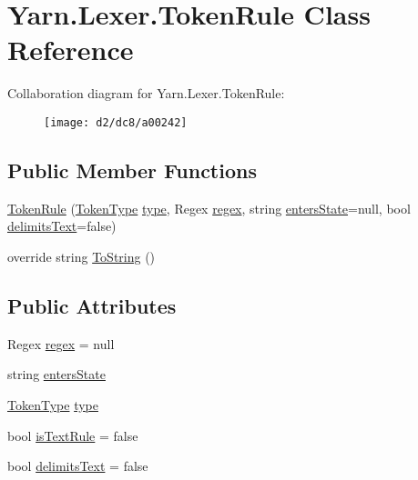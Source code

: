 \hypertarget{a00082}{\section{Yarn.\-Lexer.\-Token\-Rule Class Reference}
\label{a00082}
}


Collaboration diagram for Yarn.\-Lexer.\-Token\-Rule\-:
\nopagebreak
\begin{figure}[H]
\begin{center}
\leavevmode
\texttt{[image: d2/dc8/a00242]}
\end{center}
\end{figure}
\subsection*{Public Member Functions}
\begin{DoxyCompactItemize}
\item 
\hyperlink{a00082_a3d171ae7c4870659d2d1d977a216bdd7}{Token\-Rule} (\hyperlink{a00026_a301aa7c866593a5b625a8fc158bbeace}{Token\-Type} \hyperlink{a00082_a0de6fac3b55cf0c61e07cea53ce67caa}{type}, Regex \hyperlink{a00082_a47a404d6637fae489c3c77729a01cc69}{regex}, string \hyperlink{a00082_af6a4bd3416c4e1b8e56f9db461d52d18}{enters\-State}=null, bool \hyperlink{a00082_ab0849136a1f27b4d13cb7a45e2fe7130}{delimits\-Text}=false)
\item 
override string \hyperlink{a00082_a1ed23ad16b116ecb06dd75b157bf752f}{To\-String} ()
\end{DoxyCompactItemize}
\subsection*{Public Attributes}
\begin{DoxyCompactItemize}
\item 
Regex \hyperlink{a00082_a47a404d6637fae489c3c77729a01cc69}{regex} = null
\item 
string \hyperlink{a00082_af6a4bd3416c4e1b8e56f9db461d52d18}{enters\-State}
\item 
\hyperlink{a00026_a301aa7c866593a5b625a8fc158bbeace}{Token\-Type} \hyperlink{a00082_a0de6fac3b55cf0c61e07cea53ce67caa}{type}
\item 
bool \hyperlink{a00082_a09f49e6edf9ace38a92d723998181f8f}{is\-Text\-Rule} = false
\item 
bool \hyperlink{a00082_ab0849136a1f27b4d13cb7a45e2fe7130}{delimits\-Text} = false
\end{DoxyCompactItemize}


